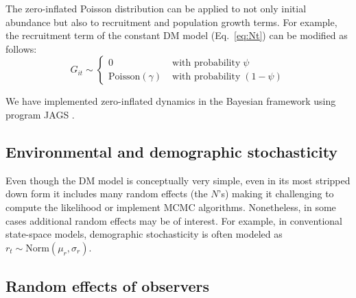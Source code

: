 \documentclass[12pt]{article}
\begin{document}
The zero-inflated Poisson distribution can be applied to not only
initial abundance but also to recruitment and population growth terms.
For example, the recruitment term of the constant DM model
(Eq.~\ref{eq:Nt}) can be modified as follows:
\begin{equation}
G_{it} \sim \left\{
\begin{aligned}
0 &\; \text{with probability} \; \psi \\
\mathrm{Poisson}(\gamma) &\; \text{with probability} \; (1-\psi)
\end{aligned} \right.
\label{eq:ZIPts}
\end{equation}

We have implemented
zero-inflated dynamics in the Bayesian framework using program
\textrm{JAGS} \citep[version 3.2.0]{plummer:2003}.


\subsection{Environmental and demographic stochasticity}

Even though the DM model is conceptually very simple, even in its most
stripped down form it includes many random effects (the $N$'s) making
it challenging to compute the likelihood or implement MCMC
algorithms. Nonetheless, in some cases additional random effects may
be of interest. For example, in conventional state-space models,
demographic stochasticity is often modeled as $r_t \sim
\text{Norm}(\mu_r, \sigma_r)$.

\subsection{Random effects of observers}
\end{document}
